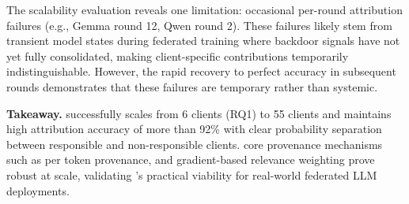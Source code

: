 The scalability evaluation reveals one limitation: occasional per-round attribution failures (e.g., Gemma round 12, Qwen round 2).
These failures likely stem from transient model states during federated training where backdoor signals have not yet fully consolidated, making client-specific contributions temporarily indistinguishable.
However, the rapid recovery to perfect accuracy in subsequent rounds demonstrates that these failures are temporary rather than systemic.


\begin{tcolorbox}[colback=white, colframe=black,  left=0pt, right=0pt, top=0pt, bottom=0pt]
  \textbf{Takeaway.} \tool successfully scales from 6 clients (RQ1) to 55 clients and maintains high attribution accuracy of more than 92\% with clear probability separation between responsible and non-responsible clients. \tools core provenance mechanisms such as per token provenance,  and gradient-based relevance weighting prove robust at scale, validating \tool's practical viability for real-world federated LLM deployments.
\end{tcolorbox}
